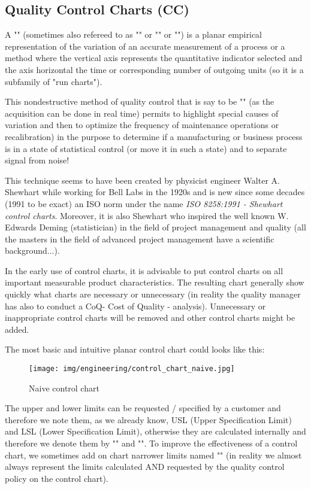 	\pagebreak
	\subsection{Quality Control Charts (CC)}
	A "" (sometimes also refereed to as "" or "" or "") is a planar empirical representation of the variation of an accurate measurement of a process or a method where the vertical axis represents the quantitative indicator selected and the axis horizontal the time or corresponding number of outgoing  units (so it is a subfamily of "run charts").

	This nondestructive method of quality control that is say to be "" (as the acquisition can be done in real time) permits to highlight special causes of variation and then to optimize the frequency of maintenance operations or recalibration) in the purpose to determine if a manufacturing or business process is in a state of statistical control (or move it in such a state) and to separate signal from noise! 
	
	This technique seems to have been created by physicist engineer Walter A. Shewhart while working for Bell Labs in the 1920s and is new since some decades (1991 to be exact) an ISO norm under the name \textit{ISO 8258:1991 - Shewhart control charts}. Moreover, it is also Shewhart who inspired the well known W. Edwards Deming (statistician) in the field of project management and quality (all the masters in the field of advanced project management have a scientific background...).

	In the early use of control charts, it is advisable to put control charts on all important measurable product characteristics. The resulting chart generally show quickly what charts are necessary or unnecessary (in reality the quality manager has also to conduct a CoQ- Cost of Quality - analysis). Unnecessary or inappropriate control charts will be removed and other control charts might be added.
	
	The most basic and intuitive planar control chart could looks like this:
	\begin{figure}[H]
		\centering
		\texttt{[image: img/engineering/control\_chart\_naive.jpg]}
		\caption{Naive control chart}
	\end{figure}
	The upper and lower limits can be requested / specified by a customer and therefore we note them, as we already know, USL (Upper Specification Limit) and LSL (Lower Specification Limit), otherwise they are calculated internally and therefore we denote them by "" and "". To improve the effectiveness of a control chart, we sometimes add on chart narrower limits named "" (in reality we almost always represent the limits  calculated AND requested by the quality control policy on the control chart). 
	
